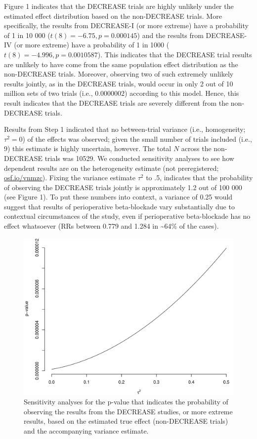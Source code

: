 \documentclass[]{article}
\begin{document}
Figure 1 indicates that the DECREASE trials are highly unlikely under
the estimated effect distribution based on the non-DECREASE trials. More
specifically, the results from DECREASE-I (or more extreme) have a
probability of 1 in 10 000 (\(t(8)=-6.75,p=0.000145\)) and the results
from DECREASE-IV (or more extreme) have a probability of 1 in 1000
(\(t(8)=-4.996,p=0.0010587\)). This indicates that the DECREASE trial
results are unlikely to have come from the same population effect
distribution as the non-DECREASE trials. Moreover, observing two of such
extremely unlikely results jointly, as in the DECREASE trials, would
occur in only 2 out of 10 million sets of two trials (i.e.,
\(0.0000002\)) according to this model. Hence, this result indicates
that the DECREASE trials are severely different from the non-DECREASE
trials.

Results from Step 1 indicated that no between-trial variance (i.e.,
homogeneity; \(\tau^2=0\)) of the effects was observed; given the small
number of trials included (i.e., 9) this estimate is highly uncertain,
however. The total \(N\) across the non-DECREASE trials was 10529. We
conducted sensitivity analyses to see how dependent results are on the
heterogeneity estimate (not preregistered;
\href{https://osf.io/vnmzc}{osf.io/vnmzc}). Fixing the variance estimate
\(\tau^2\) to .5, indicates that the probability of observing the
DECREASE trials jointly is approximately 1.2 out of 100 000 (see Figure
1). To put these numbers into context, a variance of 0.25 would suggest
that results of perioperative beta-blockade vary substantially due to
contextual circumstances of the study, even if perioperative
beta-blockade has no effect whatsoever (RRs between 0.779 and 1.284 in
\textasciitilde{}64\% of the cases).

\begin{figure}

{\centering \includegraphics[width=0.8\linewidth]{../figures/fig2} 

}

\caption{Sensitivity analyses for the p-value that indicates the probability of observing the results from the DECREASE studies, or more extreme results, based on the estimated true effect (non-DECREASE trials) and the accompanying variance estimate.}\label{fig:figure 2}
\end{figure}
\end{document}
